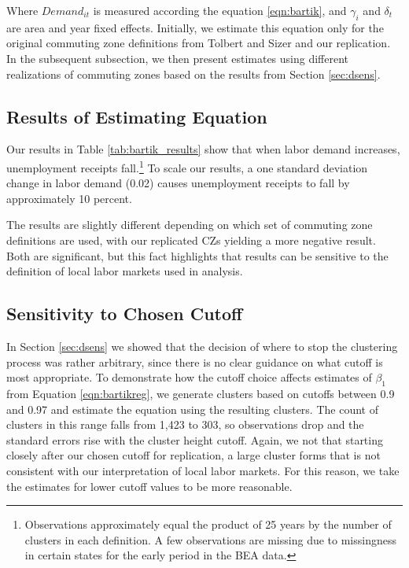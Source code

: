 Where $Demand_{it}$ is measured according the equation \ref{eqn:bartik}, and $\gamma_i$ and $\delta_t$ are area and year fixed effects. Initially, we estimate this equation only for the original commuting zone definitions from Tolbert and Sizer and our replication. In the subsequent subsection, we then present estimates using different realizations of commuting zones based on the results from Section \ref{sec:dsens}.

\subsection{Results of Estimating Equation}
\FloatBarrier



Our results in Table \ref{tab:bartik_results} show that when labor demand increases, unemployment receipts fall.\footnote{Observations approximately equal the product of 25 years by the number of clusters in each definition. A few observations are missing due to missingness in certain states for the early period in the BEA data.} To scale our results, a one standard deviation change in labor demand (0.02) causes unemployment receipts to fall by approximately 10 percent.

The results are slightly different depending on which set of commuting zone definitions are used, with our replicated CZs yielding a more negative result. Both are significant, but this fact highlights that results can be sensitive to the definition of local labor markets used in analysis.

\subsection{Sensitivity to Chosen Cutoff}

In Section \ref{sec:dsens} we showed that the decision of where to stop the clustering process was rather arbitrary, since there is no clear guidance on what cutoff is most appropriate. To demonstrate how the cutoff choice affects estimates of $\beta_1$ from Equation \ref{eqn:bartikreg}, we generate clusters based on cutoffs between 0.9 and 0.97 and estimate the equation using the resulting clusters. The count of clusters in this range falls from 1,423 to 303, so observations drop and the standard errors rise with the cluster height cutoff. Again, we not that starting closely after our chosen cutoff for replication, a large cluster forms that is not consistent with our interpretation of local labor markets. For this reason, we take the estimates for lower cutoff values to be more reasonable.

